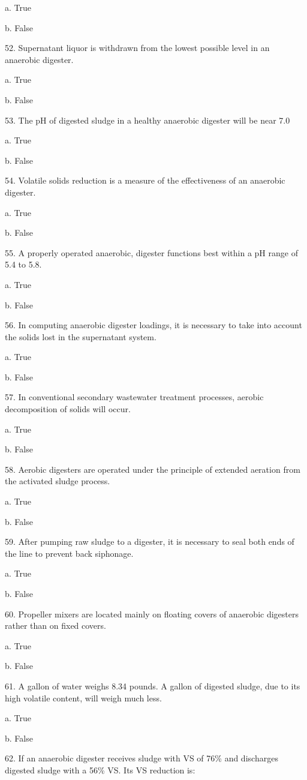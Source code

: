 \documentclass{article}
\begin{document}
a. True 

b. False 


52. Supernatant liquor is withdrawn from the lowest possible level in an anaerobic digester. 

a. True 

b. False 


53. The pH of digested sludge in a healthy anaerobic digester will be near 7.0 

a. True 

b. False 


54. Volatile solids reduction is a measure of the effectiveness of an anaerobic digester. 

a. True 

b. False 


55. A properly operated anaerobic, digester functions best within a pH range of 5.4 to 5.8. 

a. True 

b. False 


56. In computing anaerobic digester loadings, it is necessary to take into account the solids lost in the supernatant system. 

a. True 

b. False 


57. In conventional secondary wastewater treatment processes, aerobic decomposition of solids will occur. 

a. True 

b. False 


58. Aerobic digesters are operated under the principle of extended aeration from the activated sludge process. 

a. True 

b. False 


59. After pumping raw sludge to a digester, it is necessary to seal both ends of the line to prevent back siphonage. 

a. True 

b. False 


60. Propeller mixers are located mainly on floating covers of anaerobic digesters rather than on fixed covers. 

a. True 

b. False 


61. A gallon of water weighs 8.34 pounds. A gallon of digested sludge, due to its high volatile content, will weigh much less. 

a. True 

b. False 


62. If an anaerobic digester receives sludge with VS of 76\% and discharges digested sludge with a 56\% VS. Its VS reduction is:
\end{document}
